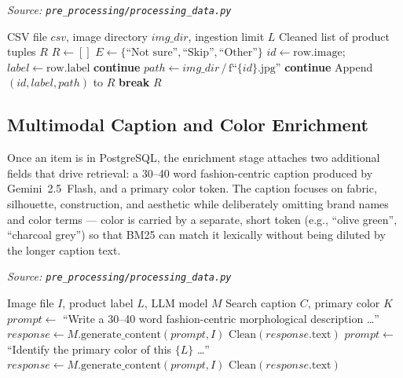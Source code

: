 \begin{algorithm}[H]
\caption{Data Ingestion and Noise Filtering}\label{alg:data_filtering}
\textit{Source: \texttt{pre\_processing/processing\_data.py}}
\begin{algorithmic}[1]
\Require CSV file $csv$, image directory $img\_dir$, ingestion limit $L$
\Ensure Cleaned list of product tuples $R$
    \State $R \gets []$
    \State $E \gets \{\text{``Not sure''}, \text{``Skip''}, \text{``Other''}\}$
        \State $id \gets \text{row.image}$;\quad $label \gets \text{row.label}$
            \State \textbf{continue}
        \EndIf
        \State $path \gets img\_dir\,/\,\text{f``\{}id\text{\}.jpg''}$
            \State \textbf{continue}
        \EndIf
        \State Append $(id, label, path)$ to $R$
            \State \textbf{break}
        \EndIf
    \EndFor
    \State \Return $R$
\EndFunction
\end{algorithmic}
\end{algorithm}

\subsection{Multimodal Caption and Color Enrichment}

Once an item is in PostgreSQL, the enrichment stage attaches two additional fields that drive retrieval: a 30--40 word fashion-centric caption produced by Gemini~2.5~Flash, and a primary color token. The caption focuses on fabric, silhouette, construction, and aesthetic while deliberately omitting brand names and color terms --- color is carried by a separate, short token (e.g., ``olive green'', ``charcoal grey'') so that BM25 can match it lexically without being diluted by the longer caption text.

\begin{algorithm}[H]
\caption{Multimodal Caption and Color Enrichment via LLM}\label{alg:llm_enrichment}
\textit{Source: \texttt{pre\_processing/processing\_data.py}}
\begin{algorithmic}[1]
\Require Image file $I$, product label $L$, LLM model $M$
\Ensure Search caption $C$, primary color $K$
    \State $prompt \gets$ ``Write a 30--40 word fashion-centric morphological description \ldots''
    \State $response \gets M.\text{generate\_content}(prompt, I)$
    \State \Return $\text{Clean}(response.\text{text})$
\EndFunction
\Statex
{}
    \State $prompt \gets$ ``Identify the primary color of this $\{L\}$ \ldots''
    \State $response \gets M.\text{generate\_content}(prompt, I)$
    \State \Return $\text{Clean}(response.\text{text})$
\EndFunction
\end{algorithmic}
\end{algorithm}

